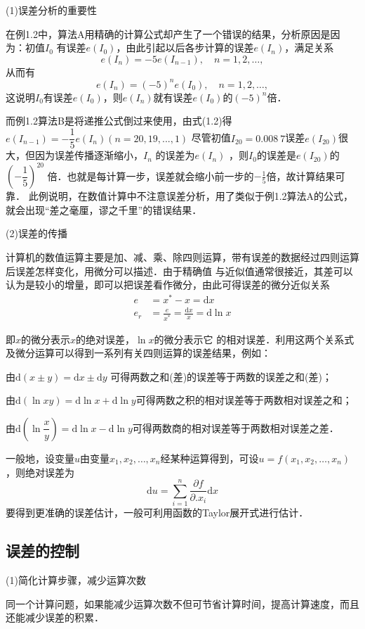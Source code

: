 (1)误差分析的重要性

在例1.2中，算法A用精确的计算公式却产生了一个错误的结果，分析原因是因为：初值$I_0$
有误差$e(I_0)$，由此引起以后各步计算的误差$e(I_n)$，满足关系
$$e(I_n)=-5e(I_{n-1}),\quad n=1,2,\ldots,$$
从而有
$$e(I_n)=(-5)^ne(I_{0}),\quad n=1,2,\ldots,$$
这说明$I_0$有误差$e(I_0)$，则$e(I_n)$就有误差$e(I_0)$的$(-5)^n$倍．

而例1.2算法B是将递推公式倒过来使用，由式(1.2)得$e(I_{n-1})=-\dfrac{1}{5}e(I_n)(n=20,19,...,1)$
尽管初值$I_{20}=0.008\ 7$误差$e(I_{20})$很大，但因为误差传播逐渐缩小，$I_n$
的误差为$e(I_n)$ ，则$I_0$的误差是$e(I_{20})$的$(-\dfrac{1}{5})^{20}$
倍．也就是每计算一步，误差就会缩小前一步的$-\frac{1}{5}$倍，故计算结果可靠．
此例说明，在数值计算中不注意误差分析，用了类似于例1.2算法A的公式，就会出现“差之毫厘，谬之千里”的错误结果．

(2)误差的传播

计算机的数值运算主要是加、减、乘、除四则运算，带有误差的数据经过四则运算后误差怎样变化，用微分可以描述．由于精确值
与近似值通常很接近，其差可以认为是较小的增量，即可以把误差看作微分，由此可得误差的微分近似关系
\begin{align*}
  e & =  x^*-x=\mathrm{d}x \\
  e_r & =  \frac{e}{x^*}=\frac{\mathrm{d}x}{x}=\mathrm{d}\ln x
\end{align*}

即$x$的微分表示$x$的绝对误差，$\ln x$的微分表示它
的相对误差．利用这两个关系式及微分运算可以得到一系列有关四则运算的误差结果，例如：

由$\mathrm{d}(x\pm y)=\mathrm{d}x\pm \mathrm{d}y$
可得两数之和(差)的误差等于两数的误差之和(差)；

由$\mathrm{d}(\ln xy)=\mathrm{d}\ln x+\mathrm{d}\ln
y$可得两数之积的相对误差等于两数相对误差之和；

由$\mathrm{d}\left(\ln\dfrac{x}{y}\right)=\mathrm{d}\ln x-\mathrm{d}\ln
y$可得两数商的相对误差等于两数相对误差之差．

\qquad 一般地，设变量$u$由变量$x_1,x_2,\ldots,
x_n$经某种运算得到，可设$u=f(x_1,x_2,\ldots,x_n)$，则绝对误差为
$$\mathrm{d}u=\sum_{i=1}^{n}\frac{\partial f}{\partial.
x_i}\mathrm{d}x$$
要得到更准确的误差估计，一般可利用函数的Taylor展开式进行估计．
\subsection{误差的控制}
(1)简化计算步骤，减少运算次数

同一个计算问题，如果能减少运算次数不但可节省计算时间，提高计算速度，而且还能减少误差的积累．

